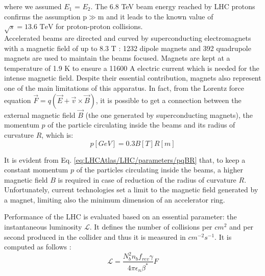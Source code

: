 \noindent where we assumed $E_1$ = $E_2$. The 6.8 TeV beam energy reached by LHC protons confirms the assumption p$\gg$m and it leads to the known value of $\sqrt{s}=13.6 \text{ TeV}$ for proton-proton collisions.\\
Accelerated beams are directed and curved by superconducting electromagnets with a magnetic field of up to 8.3 T \cite{LHC_magnets}: 1232 dipole magnets and 392 quadrupole magnets are used to maintain the beams focused. 
Magnets are kept at a temperature of 1.9 K to ensure a 11600 A electric current which is needed for the intense magnetic field. 
Despite their essential contribution, magnets also represent one of the main limitations of this apparatus. 
In fact, from the Lorentz force equation $\Vec{F}=q(\Vec{E}+\Vec{v}\times \Vec{B})$, it is possible to get a connection between the external magnetic field $\Vec{B}$ (the one generated by superconducting magnets), the  momentum $p$ of the particle circulating inside the beams and its radius of curvature $R$, which is:
\begin{equation}\label{eq:LHCAtlas/LHC/parameters/pqBR}
    p[GeV] = 0.3B[T]R[m]
\end{equation}

\noindent It is evident from Eq. \ref{eq:LHCAtlas/LHC/parameters/pqBR} that, to keep a constant momentum $p$ of the particles circulating inside the beams, a higher magnetic field $B$ is required in case of reduction of the radius of curvature $R$. Unfortunately, current technologies set a limit to the magnetic field generated by a magnet, limiting also the minimum dimension of an accelerator ring.

\noindent Performance of the LHC is evaluated based on an essential parameter: the instantaneous luminosity $\mathcal{L}$. It defines the number of collisions per $cm^2$ and per second produced in the collider and thus it is  measured in $cm^{-2}s^{-1}$. It is computed as follows \cite{LHCreport}:
\begin{equation}\label{eq:LHCAtlas/LHC/parameters/Luminosity}
    \mathcal{L}=\frac{N_b^2n_bf_{rev}\gamma}{4 \pi \epsilon_n \beta^*}F
\end{equation}

